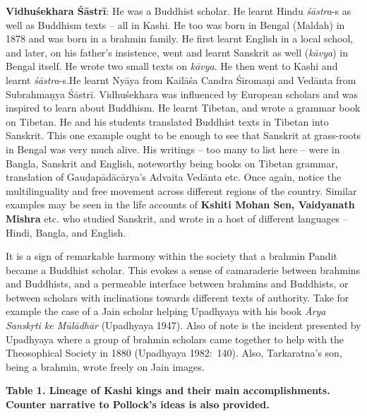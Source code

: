\textbf{Vidhuśekhara Śāstrī}: He was a Buddhist scholar. He learnt Hindu \textit{śāstra}-s as well as Buddhism texts – all in Kashi. He too was born in Bengal (Maldah) in 1878 and was born in a brahmin family. He first learnt English in a local school, and later, on his father’s insistence, went and learnt Sanskrit as well (\textit{kāvya}) in Bengal itself. He wrote two small texts on \textit{kāvya}. He then went to Kashi and learnt \textit{śāstra}-s.\break He learnt Nyāya from Kailāśa Candra Śiromaṇi and Vedānta from Subrahmaṇya Śāstrī. Vidhuśekhara was influenced by European scholars and was inspired to learn about Buddhism. He learnt Tibetan, and wrote a grammar book on Tibetan. He and his students translated Buddhist texts in Tibetan into Sanskrit. This one example ought to be enough to see that Sanskrit at grass-roots in Bengal was very much alive. His writings – too many to list here – were in Bangla, Sanskrit and English, noteworthy being books on Tibetan grammar, translation of Gauḍapādācārya’s Advaita Vedānta etc. Once again, notice the multilinguality and free movement across different regions of the country. Similar examples may be seen in the life accounts of \textbf{Kshiti Mohan Sen, Vaidyanath Mishra} etc. who studied Sanskrit, and wrote in a host of different languages – Hindi, Bangla, and English.

It is a sign of remarkable harmony within the society that a brahmin Pandit became a Buddhist scholar. This evokes a sense of camaraderie between brahmins and Buddhists, and a permeable interface between brahmins and Buddhists, or between scholars with inclinations towards different texts of authority. Take for example the case of a Jain scholar helping Upadhyaya with his book \textit{Ārya Sanskṛti ke Mūlādhār} (Upadhyaya 1947). Also of note is the incident presented by Upadhyaya where a group of brahmin scholars came together to help with the Theosophical Society in 1880 (Upadhyaya 1982:~140). Also, Tarkaratna’s son, being a brahmin, wrote freely on Jain images.

\newpage

\textbf{Table 1. Lineage of Kashi kings and their main accomplishments. Counter narrative to Pollock's ideas is also provided.}

